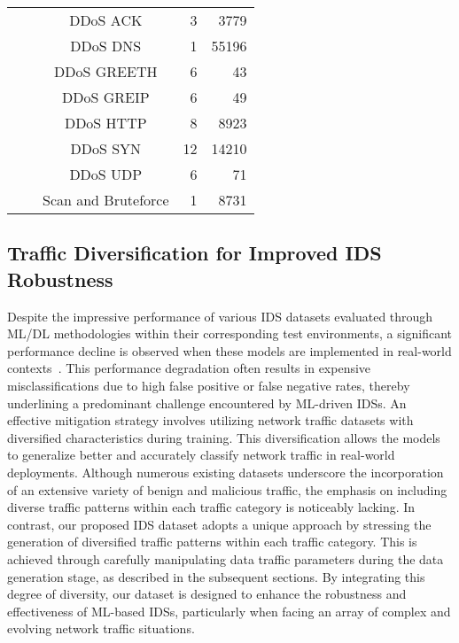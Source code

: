 \documentclass[lettersize,journal]{IEEEtran}
\begin{document}
\begin{table}
\begin{tabularx}{\columnwidth}{@{}>{\hsize=0.5cm}X>{\hsize=1.3cm}XC>{\hsize=0.3cm}RR@{}}
        &  & DDoS ACK & 3 & 3779 \\
        & & DDoS \ac{DNS} & 1 & 55196 \\
        & & DDoS GREETH & 6 & 43 \\
        & & DDoS GREIP & 6 & 49 \\
        & & DDoS HTTP & 8 & 8923 \\
        & & DDoS SYN & 12 & 14210 \\
        & & DDoS UDP & 6 & 71 \\
        & & Scan and Bruteforce & 1 & 8731 \\
\bottomrule
    \end{tabularx} 
\end{table}


\subsection{Traffic Diversification for Improved IDS Robustness}\label{sec:diversification}
Despite the impressive performance of various IDS datasets evaluated through \ac{ML}/\ac{DL} methodologies within their corresponding test environments, a significant performance decline is observed when these models are implemented in real-world contexts~\cite{sommerMLIDS}. This performance degradation often results in expensive misclassifications due to high false positive or false negative rates, thereby underlining a predominant challenge encountered by \ac{ML}-driven \acp{IDS}. An effective mitigation strategy involves utilizing network traffic datasets with diversified characteristics during training. This diversification allows the models to generalize better and accurately classify network traffic in real-world deployments. Although numerous existing datasets underscore the incorporation of an extensive variety of benign and malicious traffic, the emphasis on including diverse traffic patterns within each traffic category is noticeably lacking. In contrast, our proposed IDS dataset adopts a unique approach by stressing the generation of diversified traffic patterns within each traffic category. This is achieved through carefully manipulating data traffic parameters during the data generation stage, as described in the subsequent sections. By integrating this degree of diversity, our dataset is designed to enhance the robustness and effectiveness of \ac{ML}-based \acp{IDS}, particularly when facing an array of complex and evolving network traffic situations.
\end{document}
